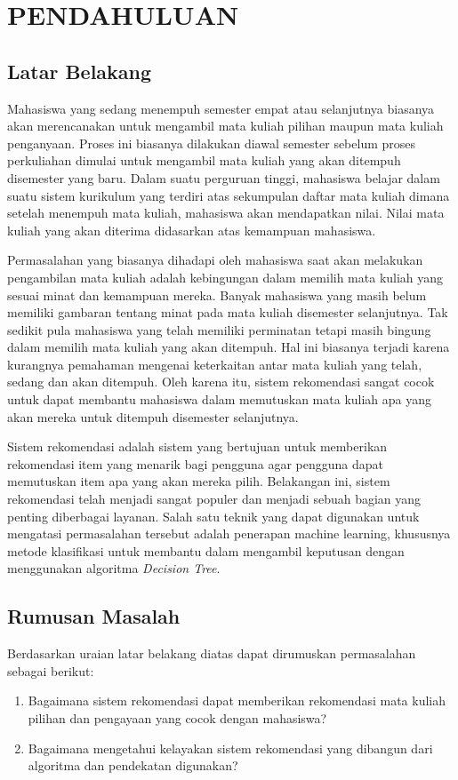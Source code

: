 \section{PENDAHULUAN}

\subsection{Latar Belakang}

Mahasiswa yang sedang menempuh semester empat atau selanjutnya biasanya akan merencanakan untuk mengambil
mata kuliah pilihan maupun mata kuliah penganyaan. Proses ini biasanya dilakukan diawal semester sebelum proses perkuliahan
dimulai untuk mengambil mata kuliah yang akan ditempuh disemester yang baru. Dalam suatu perguruan tinggi, mahasiswa belajar dalam suatu
sistem kurikulum yang terdiri atas sekumpulan daftar mata kuliah dimana setelah menempuh mata kuliah,
mahasiswa akan mendapatkan nilai. Nilai mata kuliah yang akan diterima didasarkan atas kemampuan
mahasiswa.

Permasalahan yang biasanya dihadapi oleh mahasiswa saat akan melakukan pengambilan mata kuliah adalah kebingungan dalam
memilih mata kuliah yang sesuai minat dan kemampuan mereka. Banyak mahasiswa yang masih belum memiliki gambaran tentang
minat pada mata kuliah disemester selanjutnya. Tak sedikit pula mahasiswa yang telah memiliki perminatan tetapi masih
bingung dalam memilih mata kuliah yang akan ditempuh. Hal ini biasanya terjadi karena kurangnya pemahaman mengenai
keterkaitan antar mata kuliah yang telah, sedang dan akan ditempuh. Oleh karena itu, sistem rekomendasi sangat cocok untuk
dapat membantu mahasiswa dalam memutuskan mata kuliah apa yang akan mereka untuk ditempuh disemester selanjutnya.

Sistem rekomendasi adalah sistem yang bertujuan untuk memberikan rekomendasi item yang menarik bagi pengguna agar pengguna
dapat memutuskan item apa yang akan mereka pilih. Belakangan ini, sistem rekomendasi telah menjadi sangat populer dan menjadi
sebuah bagian yang penting diberbagai layanan. Salah satu teknik yang dapat digunakan untuk mengatasi permasalahan tersebut adalah
penerapan machine learning, khususnya metode klasifikasi untuk membantu dalam mengambil keputusan dengan menggunakan algoritma
\emph{Decision Tree}.

\subsection{Rumusan Masalah}
Berdasarkan uraian latar belakang diatas dapat dirumuskan permasalahan sebagai berikut:
\begin{enumerate}[noitemsep]
      \item Bagaimana sistem rekomendasi dapat memberikan rekomendasi mata kuliah pilihan dan pengayaan
            yang cocok dengan mahasiswa?
      \item Bagaimana mengetahui kelayakan sistem rekomendasi yang dibangun dari algoritma dan pendekatan
            digunakan?
\end{enumerate}

